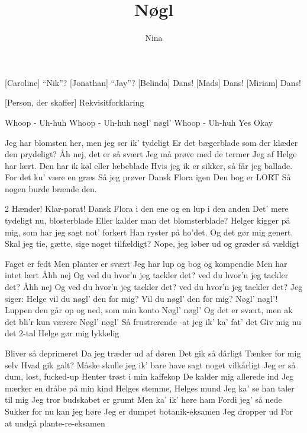 \documentclass[a4paper,11pt]{article}
\title{Nøgl}
\author{Nina}
\begin{document}
\maketitle

\begin{roles}
    [Caroline] ``Nik''?
    [Jonathan] ``Jay''?
    [Belinda] Dans!
    [Mads] Dans!
    [Miriam] Dans!
\end{roles}

\begin{props}
    [Person, der skaffer] Rekvisitforklaring
\end{props}

\begin{song}
 Whoop - Uh-huh
Whoop - Uh-huh
nøgl’ nøgl’
Whoop - Uh-huh
Yes
Okay

Jeg har blomsten her,
men jeg ser ik’ tydeligt
Er det bægerblade
som der klæder den prydeligt?
Åh nej, det er så svært
Jeg må prøve med de termer
Jeg af Helge har lært.
Den har ik køl
eller læbeblade
Hvis jeg ik er sikker,
så får jeg ballade.
For det ku’ være en græs
Så jeg prøver Dansk Flora igen
Den bog er LORT
Så nogen burde brænde den.
 
 2 Hænder! Klar-parat!
Dansk Flora i den ene og en lup i den anden
Det’ mere tydeligt nu, blosterblade
Eller kalder man det blomsterblade?
Helger kigger på mig, som har jeg sagt not’ forkert
Han ryster på ho’det.
Og det gør mig genert.
Skal jeg tie, gætte, sige noget tilfældigt?
Nope, jeg løber ud og græder så vældigt
 
Faget er fedt
Men planter er svært
Jeg har lup og bog og kompendie 
Men har intet lært
Åhh nej
Og ved du hvor’n jeg tackler det?
ved du hvor’n jeg tackler det?
Åhh nej
Og ved du hvor’n jeg tackler det?
ved du hvor’n jeg tackler det?
Jeg siger:
Helge vil du nøgl’ den for mig?
Vil du nøgl’ den for mig?
Nøgl’ nøgl’!
Luppen den går op og ned, som min konto
Nøgl’ nøgl’
Og det er svært, men ak det bli’r kun værere
Nøgl’ nøgl’
Så frustrerende -at jeg ik’ ka’ fat’ det
Giv mig nu det 2-tal
Helge gør mig lykkelig

Bliver så deprimeret
Da jeg træder ud af døren
Det gik så dårligt
Tænker for mig selv
Hvad gik galt?
Måske skulle jeg ik’ bare have sagt noget vilkårligt
Jeg er så dum, lost, fucked-up 
Henter trøst i min kaffekop
De kalder mig allerede ind
Jeg mærker en dråbe på min kind
Helges stemme, Helges mund
Jeg ka’ se han taler til mig
Jeg tror budskabet er grumt
Men ka’ ik’ høre ham
Fordi jeg’ så nede
Sukker for nu kan jeg høre
Jeg er dumpet botanik-eksamen
Jeg dropper ud
For at undgå plante-re-eksamen


\end{song}
\end{document}
